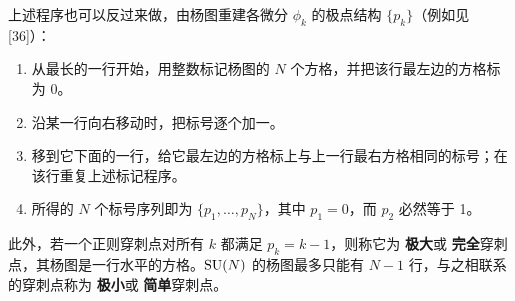 
上述程序也可以反过来做，由杨图重建各微分 $\phi_k$ 的极点结构 $\{p_k\}$（例如见 [36]）：
\begin{enumerate}
  \item 从最长的一行开始，用整数标记杨图的 $N$ 个方格，并把该行最左边的方格标为 0。
  \item 沿某一行向右移动时，把标号逐个加一。
  \item 移到它下面的一行，给它最左边的方格标上与上一行最右方格相同的标号；在该行重复上述标记程序。
  \item 所得的 $N$ 个标号序列即为 $\{p_1,\ldots,p_N\}$，其中 $p_1=0$，而 $p_2$ 必然等于 1。
\end{enumerate}
此外，若一个正则穿刺点对所有 $k$ 都满足 $p_k=k-1$，则称它为 \textbf{极大}或 \textbf{完全}穿刺点，其杨图是一行水平的方格。$\mathrm{SU}(N)$ 的杨图最多只能有 $N-1$ 行，与之相联系的穿刺点称为 \textbf{极小}或 \textbf{简单}穿刺点。

